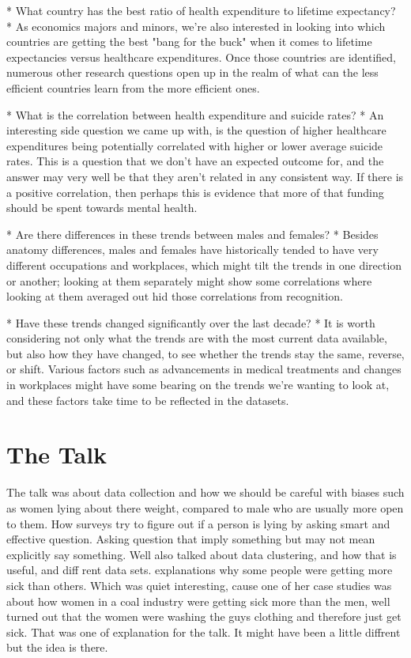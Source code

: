 \documentclass[11pt]{article}
\begin{document}
\begin{enumerate}
\begin{itemize}
* What country has the best ratio of health expenditure to lifetime expectancy?
  * As economics majors and minors, we're also interested in looking into which
    countries are getting the best "bang for the buck" when it comes to lifetime
    expectancies versus healthcare expenditures.  Once those countries are
    identified, numerous other research questions open up in the realm of what
    can the less efficient countries learn from the more efficient ones.

* What is the correlation between health expenditure and suicide rates?
  * An interesting side question we came up with, is the question of higher
    healthcare expenditures being potentially correlated with higher or lower
    average suicide rates.  This is a question that we don't have an expected
    outcome for, and the answer may very well be that they aren't related in any
    consistent way.  If there is a positive correlation, then perhaps this is
    evidence that more of that funding should be spent towards mental health.

* Are there differences in these trends between males and females?
  * Besides anatomy differences, males and females have historically tended to
    have very different occupations and workplaces, which might tilt the trends
    in one direction or another; looking at them separately might show some
    correlations where looking at them averaged out hid those correlations from
    recognition.

* Have these trends changed significantly over the last decade?
  * It is worth considering not only what the trends are with the most current
    data available, but also how they have changed, to see whether the trends
    stay the same, reverse, or shift.  Various factors such as advancements in
    medical treatments and changes in workplaces might have some bearing on the
    trends we're wanting to look at, and these factors take time to be reflected
    in the datasets.


\end{itemize}


\section{The Talk}
The talk was about data collection and how we should be careful with biases such as women lying about there weight, compared to male who are usually more open to them. How  surveys try to figure out if a person is lying by asking smart and effective question. Asking question that imply something but may not mean explicitly say something. Well also talked about data clustering, and how that is useful, and diff rent data sets. explanations why some people were getting more sick than others. Which was quiet interesting, cause one of her case studies was about how women in a coal industry were getting sick more than the men, well turned out that the women were washing the guys clothing and therefore just  get sick. That was one of explanation for the talk. It might have been a little diffrent but the idea is there. 

\end{enumerate}
\end{document}
